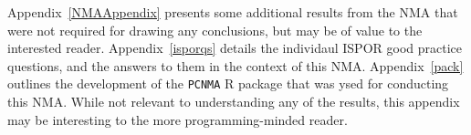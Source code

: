 Appendix~\ref{NMAAppendix} presents some additional results from the NMA that were not required for drawing any conclusions, but may be of value to the interested reader. Appendix~\ref{isporqs} details the individaul ISPOR good practice questions, and the answers to them in the context of this NMA. Appendix~\ref{pack} outlines the development of the \verb|PCNMA| R package that was ysed for conducting this NMA. While not relevant to understanding any of the results, this appendix may be interesting to the more programming-minded reader.